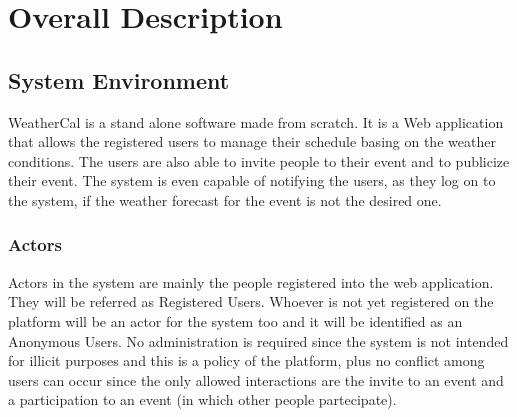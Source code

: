 \chapter{Overall Description} \label{cap:cap2}
\section{System Environment}
WeatherCal is a stand alone software made from scratch. It is a Web application that allows the registered users to manage their schedule basing on the weather conditions. The users are also able to invite people to their event and to publicize their event.  
The system is even capable of notifying the users, as they log on to the system, if the weather forecast for the event is not the desired one.
\subsection{Actors}
Actors in the system are mainly the people registered into the web application. They will be referred as Registered Users.
Whoever is not yet registered on the platform will be an actor for the system too and it will be identified as an Anonymous  Users.
No administration is required since the system is not intended for illicit purposes and this is a policy of the platform, plus no conflict among users can occur since the only allowed interactions are the invite to an event and a participation to an event (in which other people partecipate).
